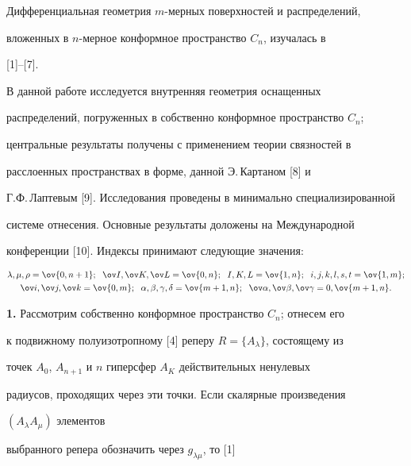 \label{begin} 


 


 


Дифференциальная геометрия $m$-мерных поверхностей и распределений, 


вложенных в $n$-мерное конформное пространство $C_n$, изучалась в 


[1]--[7]. 


В данной работе исследуется внутренняя геометрия оснащенных 


распределений, погруженных в собственно конформное пространство $C_n$; 


центральные результаты получены с применением теории связностей в 


расслоенных пространствах в форме, данной Э.\,Картаном [8] и 


Г.Ф.\,Лаптевым [9]. Исследования проведены в минимально специализированной 


системе отнесения. Основные результаты доложены на Международной 


конференции [10]. Индексы принимают следующие значения: 


\begin{gather*} 


\lambda,\mu,\rho=\ov{0,n+1};\ \; \ov I,\ov K,\ov L=\ov{0,n}; 


\ \; I,K,L=\ov{1,n}; \ \; i,j,k,l,s,t=\ov{1,m}; \\ 


\ov i,\ov j,\ov k=\ov{0,m}; 


\ \; \alpha,\beta,\gamma,\delta=\ov{m+1,n}; 


\ \; \ov\alpha,\ov\beta,\ov\gamma=0,\ov{m+1,n}. 


\end{gather*} 


 


{\bf 1.} Рассмотрим собственно конформное пространство $C_n$; отнесем его 


к подвижному полуизотропному [4] реперу $R=\{A_\lambda\}$, состоящему из 


точек $A_0$, $A_{n+1}$ и $n$ гиперсфер $A_K$ действительных ненулевых 


радиусов, проходящих через эти точки. Если скалярные произведения 


$(A_\lambda A_\mu)$ элементов 


выбранного репера обозначить через $g_{\lambda\mu}$, то [1] 


